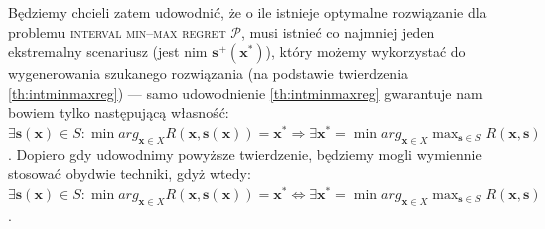 Będziemy chcieli zatem udowodnić, że o ile istnieje optymalne rozwiązanie dla problemu \textsc{interval min--max regret $\mathcal{P}$}, musi istnieć co najmniej jeden ekstremalny scenariusz (jest nim $\textbf{s}^{+} \left( \textbf{x}^{\ast} \right)$), który możemy wykorzystać do wygenerowania szukanego rozwiązania (na podstawie twierdzenia \ref{th:intminmaxreg}) --- samo udowodnienie \ref{th:intminmaxreg} gwarantuje nam bowiem tylko następującą własność: $\exists \textbf{s} \left( \textbf{x} \right) \in S : \min arg_{\textbf{x} \in X} R \left( \textbf{x}, \textbf{s} \left( \textbf{x} \right) \right) = \textbf{x}^{\ast} \Rightarrow \exists \textbf{x}^{\ast} = \min arg_{\textbf{x} \in X} \max_{\textbf{s} \in S} R \left( \textbf{x}, \textbf{s} \right)$. Dopiero gdy udowodnimy powyższe twierdzenie, będziemy mogli wymiennie stosować obydwie techniki, gdyż wtedy: $\exists \textbf{s} \left( \textbf{x} \right) \in S : \min arg_{\textbf{x} \in X} R \left( \textbf{x}, \textbf{s} \left( \textbf{x} \right) \right) = \textbf{x}^{\ast} \Leftrightarrow \exists \textbf{x}^{\ast} = \min arg_{\textbf{x} \in X} \max_{\textbf{s} \in S} R \left( \textbf{x}, \textbf{s} \right)$.
\\
